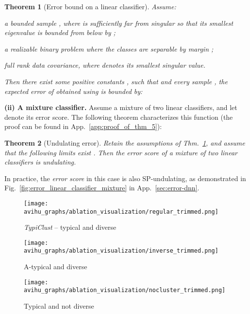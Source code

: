 \documentclass{article}
\newcommand{\myparagraph}[1]{\smallskip\noindent\textbf{#1}}
\newcommand{\app}{App.}
\newtheorem{theorem}{Theorem}
\begin{document}
\begin{theorem}[Error bound on a linear classifier]
\label{thm:error_bound_pw_linear}
Assume: \begin{inparaenum}[(i)] \item a bounded sample , where  is sufficiently far from singular so that its smallest eigenvalue is bounded from below by ; \item a realizable binary problem where the classes are separable by margin ; \item full rank data covariance, where  denotes its smallest singular value. \end{inparaenum} Then there exist some positive constants , such that  and every sample , the expected error of  obtained using  is bounded by:

\end{theorem}



\myparagraph{(ii) A mixture classifier.}
Assume a mixture of two linear classifiers, and let  denote its error score. The following theorem characterizes this function (the proof can be found in \app~\ref{app:proof_of_thm_5}):
\begin{theorem}[Undulating error]
\label{thm:undulating_pw_linear}
Retain the assumptions of Thm.~\ref{thm:error_bound_pw_linear}, and assume that  the following limits exist  . 
Then the error score of a mixture of two linear classifiers is undulating. 
\end{theorem}

In practice, the \emph{error score} in this case is also SP-undulating, as demonstrated in Fig.~\ref{fig:error_linear_classifier_mixture} in \app~\ref{sec:error-dnn}.

\begin{figure*}[thb!]
    \begin{subfigure}{.33\textwidth}
      \centering
      \texttt{[image: avihu\_graphs/ablation\_visualization/regular\_trimmed.png]}
      \caption{\emph{TypiClust} -- typical and diverse}
      \label{subfig:clustering_matters_regular}
    \end{subfigure}
    \begin{subfigure}{.33\textwidth}
      \centering
      \texttt{[image: avihu\_graphs/ablation\_visualization/inverse\_trimmed.png]}
      \caption{A-typical and diverse}
      \label{subfig:clustering_matters_inverse}
    \end{subfigure}
    \begin{subfigure}{.33\textwidth}
      \centering
      \texttt{[image: avihu\_graphs/ablation\_visualization/nocluster\_trimmed.png]}
      \caption{Typical and not diverse}
      \label{subfig:clustering_matters_nocluster}
    \end{subfigure}
    \caption{Qualitative visualization of diversity and typicality in the low budget regime on CIFAR-10. (a) Diverse typical images chosen by \emph{TypiClust}. (b) Picking the \emph{least} typical example in each cluster. (c) Picking the most typical examples, without enforcing diversity.}
    \label{fig:clustering_matters}
\vspace{-0.3cm}
\end{figure*}
\end{document}
